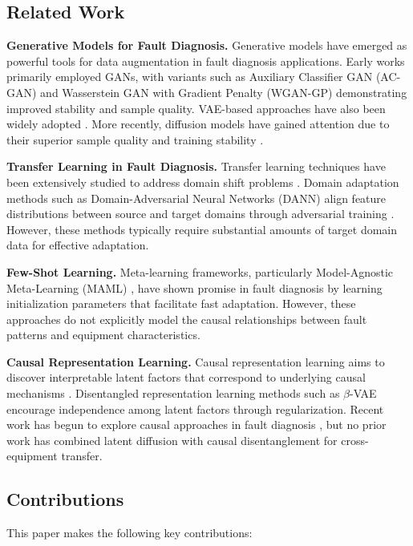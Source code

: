 \documentclass[lettersize,journal]{IEEEtran}
\begin{document}
\subsection{Related Work}

\textbf{Generative Models for Fault Diagnosis.} Generative models have emerged as powerful tools for data augmentation in fault diagnosis applications. Early works primarily employed GANs, with variants such as Auxiliary Classifier GAN (AC-GAN) \cite{ref9} and Wasserstein GAN with Gradient Penalty (WGAN-GP) \cite{ref10} demonstrating improved stability and sample quality. VAE-based approaches have also been widely adopted \cite{ref11}. More recently, diffusion models have gained attention due to their superior sample quality and training stability \cite{ref1,ref8,ref14}.

\textbf{Transfer Learning in Fault Diagnosis.} Transfer learning techniques have been extensively studied to address domain shift problems \cite{ref26,ref27}. Domain adaptation methods such as Domain-Adversarial Neural Networks (DANN) align feature distributions between source and target domains through adversarial training \cite{ref12}. However, these methods typically require substantial amounts of target domain data for effective adaptation.

\textbf{Few-Shot Learning.} Meta-learning frameworks, particularly Model-Agnostic Meta-Learning (MAML) \cite{ref13}, have shown promise in fault diagnosis by learning initialization parameters that facilitate fast adaptation. However, these approaches do not explicitly model the causal relationships between fault patterns and equipment characteristics.

\textbf{Causal Representation Learning.} Causal representation learning aims to discover interpretable latent factors that correspond to underlying causal mechanisms \cite{ref16,ref17}. Disentangled representation learning methods such as $\beta$-VAE \cite{ref18} encourage independence among latent factors through regularization. Recent work has begun to explore causal approaches in fault diagnosis \cite{ref2}, but no prior work has combined latent diffusion with causal disentanglement for cross-equipment transfer.

\subsection{Contributions}

This paper makes the following key contributions:
\end{document}
